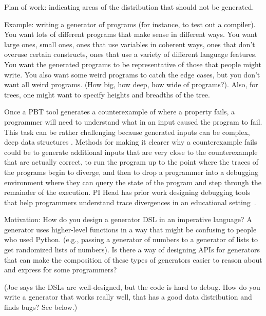 
Plan of work: indicating areas of the distribution that should not be generated.

Example: writing a generator of programs (for instance, to test out a compiler). You want lots of different programs that make sense in different ways. You want large ones, small ones, ones that use variables in coherent ways, ones that don’t overuse certain constructs, ones that use a variety of different language features. You want the generated programs to be representative of those that people might write. You also want some weird programs to catch the edge cases, but you don’t want all weird programs. (How big, how deep, how wide of programs?). Also, for trees, one might want to specify heights and breadths of the tree.


Once a PBT tool generates a counterexample of where a property fails, a programmer will need to understand what in an input caused the program to fail. This task can be rather challenging because generated inputs can be complex, deep data structures . Methods for making it clearer why a counterexample fails could be to generate additional inputs that are very close to the counterexample that are actually correct, to run the program up to the point where the traces of the programs begin to diverge, and then to drop a programmer into a debugging environment where they can query the state of the program and step through the remainder of the execution. PI Head has prior work designing debugging tools that help programmers understand trace divergences in an educational setting~\cite{suzuki2017tracediff}.


Motivation: How do you design a generator DSL in an imperative language? A generator uses higher-level functions in a way that might be confusing to people who used Python.  (e.g., passing a generator of numbers to a generator of lists to get randomized lists of numbers). Is there a way of designing APIs for generators that can make the composition of these types of generators easier to reason about and express for some programmers?

(Joe says the DSLs are well-designed, but the code is hard to debug. How do you write a generator that works really well, that has a good data distribution and finds bugs? See below.)

